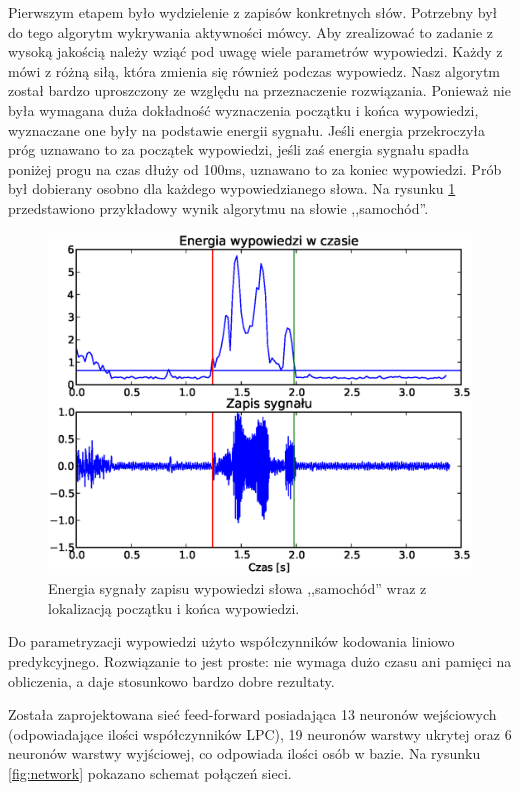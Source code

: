\documentclass[a4paper]{article}
\begin{document}
Pierwszym etapem było wydzielenie z zapisów konkretnych słów. Potrzebny był do
tego algorytm wykrywania aktywności mówcy. Aby zrealizować to zadanie z wysoką
jakością należy wziąć pod uwagę wiele parametrów wypowiedzi. Każdy z mówi z
różną siłą, która zmienia się również podczas wypowiedz. Nasz algorytm został
bardzo uproszczony ze względu na przeznaczenie rozwiązania. Ponieważ nie była
wymagana duża dokładność wyznaczenia początku i końca wypowiedzi, wyznaczane
one były na podstawie energii sygnału. Jeśli energia przekroczyła próg uznawano
to za początek wypowiedzi, jeśli zaś energia sygnału spadła poniżej progu na
czas dłuży od 100ms, uznawano to za koniec wypowiedzi. Prób był dobierany
osobno dla każdego wypowiedzianego słowa. Na rysunku \ref{fig:say}
przedstawiono przykładowy wynik algorytmu na słowie ,,samochód''.

\begin{figure}[h!]
    \includegraphics[width=\textwidth]{say_samochod}
    \caption{Energia sygnały zapisu wypowiedzi słowa ,,samochód'' wraz z
    lokalizacją początku i końca wypowiedzi.}
    \label{fig:say}
\end{figure}

Do parametryzacji wypowiedzi użyto współczynników kodowania liniowo predykcyjnego.
Rozwiązanie to jest proste: nie wymaga dużo czasu ani pamięci na obliczenia, a
daje stosunkowo bardzo dobre rezultaty.

Została zaprojektowana sieć feed-forward posiadająca 13 neuronów wejściowych
(odpowiadające ilości współczynników LPC), 19 neuronów warstwy ukrytej oraz 6
neuronów warstwy wyjściowej, co odpowiada ilości osób w bazie. Na rysunku
\ref{fig:network} pokazano schemat połączeń sieci.
\end{document}
